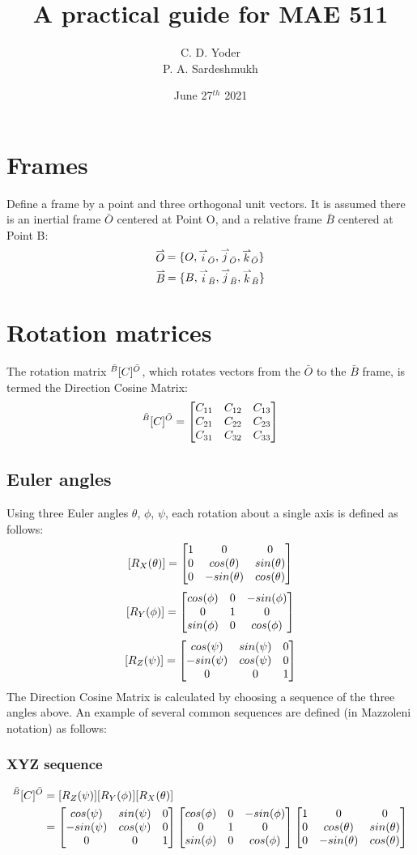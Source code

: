 \documentclass{article}
\title{A practical guide for MAE 511}
\author{C. D. Yoder\\P. A. Sardeshmukh}
\date{June 27$^{th}$ 2021}  %
\begin{document}
\maketitle

\section{Frames}
\label{sec:frames}
Define a frame by a point and three orthogonal unit vectors. It is assumed there is an inertial frame $\bar{O}$ centered at Point O, and a relative frame $\bar{B}$ centered at Point B:
\begin{equation}
    \FrameDef{O}{O}
\end{equation}
\begin{equation}
    \FrameDef{B}{B}
\end{equation}

\section{Rotation matrices}
\label{sec:rotmat}
The rotation matrix $ {}^{\bar{B}}\lbrack{C}\rbrack^{\bar{O}}$, which rotates vectors from the $\bar{O}$ to the $\bar{B}$ frame, is termed the Direction Cosine Matrix:
\begin{equation}
     {}^{\bar{B}}\lbrack{C}\rbrack^{\bar{O}} =  \begin{bmatrix} C_{11} & C_{12} & C_{13} \\ C_{21} & C_{22} & C_{23} \\ C_{31} & C_{32} & C_{33} \end{bmatrix} 
\end{equation}

\subsection{Euler angles}
\label{subsec:eulers}
Using three Euler angles $\theta$, $\phi$, $\psi$, each rotation about a single axis is defined as follows:
\begin{equation}
    [R_{{X}}({\theta})] =  \begin{bmatrix} 1 & 0 & 0 \\ 0 & cos(\theta) & sin(\theta) \\ 0 & -sin(\theta) & cos(\theta) \end{bmatrix} 
    \label{eq:x}
\end{equation}
\begin{equation}
    [R_{{Y}}({\phi})] =  \begin{bmatrix} cos(\phi) & 0 & -sin(\phi) \\ 0 & 1 & 0 \\ sin(\phi) & 0& cos(\phi) \end{bmatrix} 
    \label{eq:y}
\end{equation}
\begin{equation}
    [R_{{Z}}({\psi})] =  \begin{bmatrix} cos(\psi) & sin(\psi) & 0 \\ -sin(\psi) & cos(\psi) & 0 \\ 0 & 0 & 1 \end{bmatrix} 
    \label{eq:z}
\end{equation}
% 
The Direction Cosine Matrix is calculated by choosing a sequence of the three angles above. An example of several common sequences are defined (in Mazzoleni notation) as follows:
\subsubsection{XYZ sequence}
\begin{equation}
    \begin{split}
         {}^{\bar{B}}\lbrack{C}\rbrack^{\bar{O}} & = [R_{{Z}}({\psi})][R_{{Y}}({\phi})][R_{{X}}({\theta})] \\
         & = \begin{bmatrix} cos(\psi) & sin(\psi) & 0 \\ -sin(\psi) & cos(\psi) & 0 \\ 0 & 0 & 1 \end{bmatrix}  \begin{bmatrix} cos(\phi) & 0 & -sin(\phi) \\ 0 & 1 & 0 \\ sin(\phi) & 0& cos(\phi) \end{bmatrix}  \begin{bmatrix} 1 & 0 & 0 \\ 0 & cos(\theta) & sin(\theta) \\ 0 & -sin(\theta) & cos(\theta) \end{bmatrix} 
    \end{split}
\end{equation}
\end{document}
